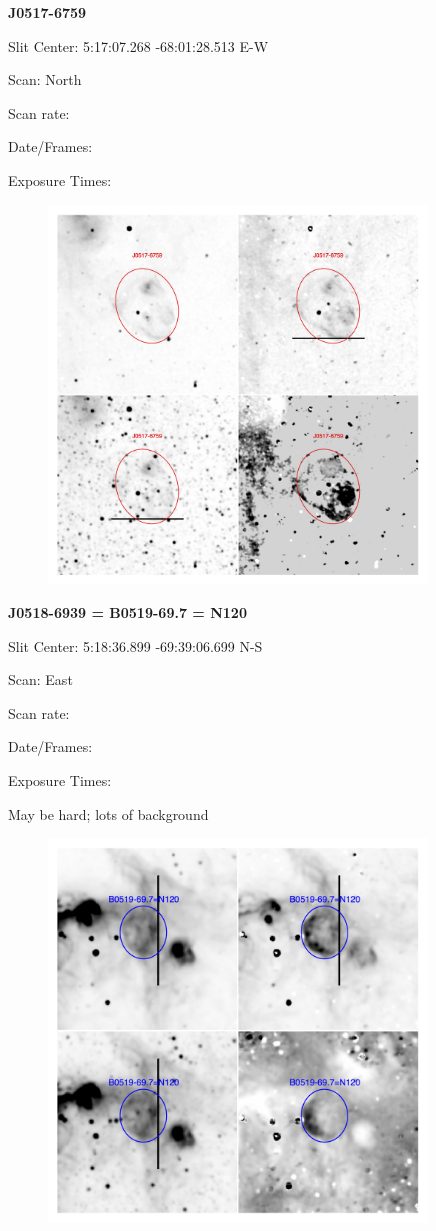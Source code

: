 \documentclass[11pt]{article}
\begin{document}
\newpage
{\bf J0517-6759}  
 
Slit Center:   5:17:07.268 -68:01:28.513    E-W 

Scan:  North

Scan rate:  

Date/Frames:

Exposure Times:  

\begin{figure}
\includegraphics[width=10.05cm]{snapshots/J0517-6759.png}
\end{figure}

\newpage
{\bf J0518-6939 = B0519-69.7 = N120}  
 
Slit Center:   5:18:36.899  -69:39:06.699   N-S

Scan:  East

Scan rate:  

Date/Frames:

Exposure Times:  

May be hard; lots of background
\begin{figure}
\includegraphics[width=10.05cm]{snapshots/B0519-697.png}
\end{figure}
\end{document}
